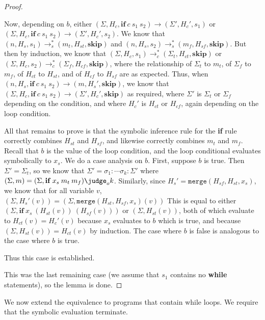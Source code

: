 \begin{proof}
\begin{itemize}
    Now, depending on $b$,
    either
    $(\Sigma, H_c, \mathbf{if}\:c\:s_1\:s_2) \to (\Sigma', H_c', s_1)$
    or
    $(\Sigma, H_c, \mathbf{if}\:c\:s_1\:s_2) \to (\Sigma', H_c', s_2)$.
    We know that
    $(n, H_s, s_1) \to_s^{*} (m_t, H_{st}, \mathbf{skip})$
    and
    $(n, H_s, s_2) \to_s^{*} (m_f, H_{sf}, \mathbf{skip})$.
    But then by induction, we know that
    $(\Sigma, H_c, s_1) \to_c^{*} (\Sigma_t, H_{ct}, \mathbf{skip})$
    or
    $(\Sigma, H_c, s_2) \to_c^{*} (\Sigma_f, H_{cf}, \mathbf{skip})$,
    where the relationship of $\Sigma_t$ to $m_t$, of $\Sigma_f$ to
    $m_f$, of $H_{ct}$ to $H_{st}$, and of $H_{cf}$ to $H_{sf}$ are
    as expected.
    Thus, when
    $(n, H_s, \mathbf{if}\:c\:s_1\:s_2) \to (m, H_s', \mathbf{skip})$,
    we know that
    $(\Sigma, H_c, \mathbf{if}\:c\:s_1\:s_2) \to (\Sigma', H_c', \mathbf{skip})$
    as required, where $\Sigma'$ is $\Sigma_t$ or $\Sigma_f$ depending
    on the condition, and where $H_c'$ is $H_{ct}$ or $H_{cf}$, again
    depending on the loop condition.

    All that remains to prove is that the symbolic inference rule for
    the \textbf{if} rule correctly combines $H_{st}$ and $H_{sf}$, and
    likewise correctly combines $m_t$ and $m_f$.
    Recall that $b$ is the value of the loop condition, and the loop
    conditional evaluates symbolically to $x_s$.
    We do a case analysis on $b$.
    First, suppose $b$ is true.  Then $\Sigma' = \Sigma_t$, so we know
    that $\Sigma' = \sigma_1:\dotsb\sigma_k:\Sigma'$ where
    $(\Sigma, m) = (\Sigma, \mathbf{if}\:x_s\:m_t\:m_f) \judge_o k$.
    Similarly, since $H_s' = \mathtt{merge}(H_{sf}, H_{st}, x_s)$,
    we know that for all variable $v$,
    $(\Sigma, H_s'(v)) = (\Sigma, \mathtt{merge}(H_{st}, H_{sf}, x_s)(v))$
    This is equal to either $(\Sigma, \mathbf{if}\:x_s\:(H_{st}(v))\:(H_{sf}(v)))$
    or $(\Sigma, H_{st}(v))$, both of which evaluate to $H_{ct}(v) = H_c'(v)$
    because $x_s$ evaluates to $b$ which is true, and because
    $(\Sigma, H_{st}(v)) = H_{ct}(v)$ by induction.
    The case where $b$ is false is analogous to the case where $b$ is
    true.

    Thus this case is established.
  \end{itemize}

  This was the last remaining case (we assume that $s_1$ contains no
  \textbf{while} statements), so the lemma is done.
\end{proof}

We now extend the equivalence to programs that contain while loops.
We require that the symbolic evaluation terminate.

